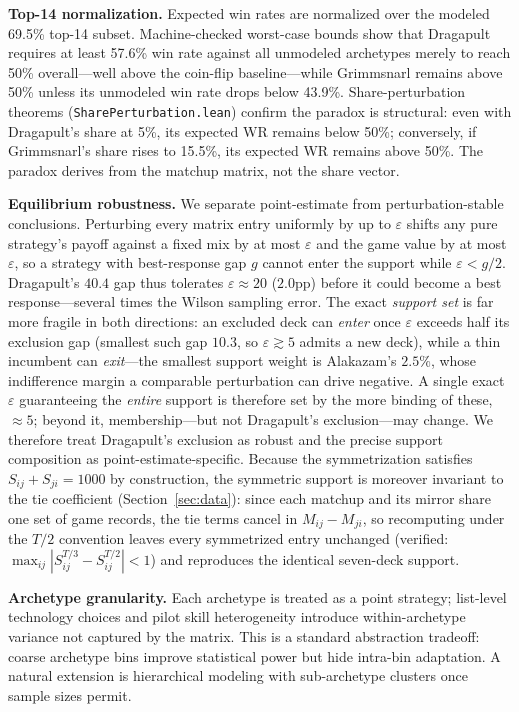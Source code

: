 \documentclass[journal]{IEEEtran}
\newif\ifhighlightchanges
\newcommand{\revised}[1]{\ifhighlightchanges\textcolor{blue!70!black}{#1}\else#1\fi}
\begin{document}
\textbf{Top-14 normalization.}
Expected win rates are normalized over the modeled 69.5\% top-14 subset.
Machine-checked worst-case bounds show that Dragapult requires at least 57.6\% win rate against all unmodeled archetypes merely to reach 50\% overall---well above the coin-flip baseline---while Grimmsnarl remains above 50\% unless its unmodeled win rate drops below 43.9\%.
Share-perturbation theorems (\texttt{SharePerturbation.lean}) confirm the paradox is structural: even with Dragapult's share at 5\%, its expected WR remains below 50\%; conversely, if Grimmsnarl's share rises to 15.5\%, its expected WR remains above 50\%.
The paradox derives from the matchup matrix, not the share vector.

\revised{\textbf{Equilibrium robustness.}
We separate point-estimate from perturbation-stable conclusions.
Perturbing every matrix entry uniformly by up to $\varepsilon$ shifts any pure strategy's payoff against a fixed mix by at most $\varepsilon$ and the game value by at most $\varepsilon$, so a strategy with best-response gap $g$ cannot enter the support while $\varepsilon<g/2$.
Dragapult's $40.4$\textperthousand{} gap thus tolerates $\varepsilon\approx20$\textperthousand{} ($2.0$pp) before it could become a best response---several times the Wilson sampling error.
The exact \emph{support set} is far more fragile in both directions: an excluded deck can \emph{enter} once $\varepsilon$ exceeds half its exclusion gap (smallest such gap $10.3$\textperthousand{}, so $\varepsilon\gtrsim5$\textperthousand{} admits a new deck), while a thin incumbent can \emph{exit}---the smallest support weight is Alakazam's $2.5\%$, whose indifference margin a comparable perturbation can drive negative.
A single exact $\varepsilon$ guaranteeing the \emph{entire} support is therefore set by the more binding of these, ${\approx}5$\textperthousand{}; beyond it, membership---but not Dragapult's exclusion---may change.
We therefore treat Dragapult's exclusion as robust and the precise support composition as point-estimate-specific.
Because the symmetrization satisfies $S_{ij}+S_{ji}=1000$ by construction, the symmetric support is moreover invariant to the tie coefficient (Section~\ref{sec:data}): since each matchup and its mirror share one set of game records, the tie terms cancel in $M_{ij}-M_{ji}$, so recomputing under the $T/2$ convention leaves every symmetrized entry unchanged (verified: $\max_{ij}|S_{ij}^{T/3}-S_{ij}^{T/2}|<1$\textperthousand) and reproduces the identical seven-deck support.}

\textbf{Archetype granularity.}
Each archetype is treated as a point strategy; list-level technology choices and pilot skill heterogeneity introduce within-archetype variance not captured by the matrix.
This is a standard abstraction tradeoff: coarse archetype bins improve statistical power but hide intra-bin adaptation.
A natural extension is hierarchical modeling with sub-archetype clusters once sample sizes permit.
\end{document}
